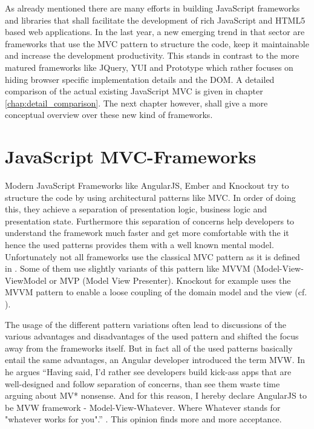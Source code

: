 As already mentioned there are many efforts in building JavaScript frameworks and libraries that shall facilitate the development of rich JavaScript and HTML5 based web applications.
In the last year, a new emerging trend in that sector are frameworks that use the MVC pattern to structure the code, keep it maintainable and increase the development productivity.
This stands in contrast to the more matured frameworks like JQuery, YUI and Prototype which rather focuses on hiding browser specific implementation details and the DOM.
A detailed comparison of the actual existing JavaScript MVC is given in chapter \ref{chap:detail_comparison}.
The next chapter however, shall give a more conceptual overview over these new kind of frameworks.
 
\section{JavaScript MVC-Frameworks}

Modern JavaScript Frameworks like AngularJS, Ember and Knockout try to structure the code by using architectural patterns like MVC.
In order of doing this, they achieve a separation of presentation logic, business logic and presentation state.
Furthermore this separation of concerns help developers to understand the framework much faster and get more comfortable with the it hence the used patterns provides them with a well known mental model. 
Unfortunately not all frameworks use the classical MVC pattern as it is defined in \autocite[]{smalltalk_mvc}.
Some of them use slightly variants of this pattern like MVVM (Model-View-ViewModel or MVP (Model View Presenter).
Knockout for example uses the MVVM pattern to enable a loose coupling of the domain model and the view (cf.
\autocite{heise_knockout}).
 
The usage of the different pattern variations often lead to discussions of the various advantages and disadvantages of the used pattern and shifted the focus away from the frameworks itself.
But in fact all of the used patterns basically entail the same advantages, an Angular developer introduced the term MVW.
In he argues \enquote{Having said, I'd rather see developers build kick-ass apps that are well-designed and follow separation of concerns, than see them waste time arguing about MV* nonsense.
And for this reason, I hereby declare AngularJS to be MVW framework - Model-View-Whatever.
Where Whatever stands for "whatever works for you".} \autocite[]{anguler_mvw}.
This opinion finds more and more acceptance. 

